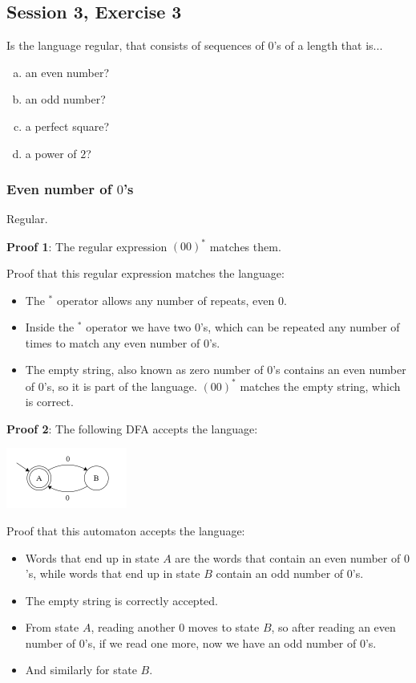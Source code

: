 \subsection{Session 3, Exercise 3}


Is the language regular, that consists of sequences of $0$'s of a length that is...
\begin{enumerate}[a.)]
\item an even number?
\item an odd number?
\item a perfect square?
\item a power of $2$?
\end{enumerate}


\subsubsection{Even number of $0$'s}

Regular.

\textbf{Proof 1}: The regular expression $(00)^*$ matches them.

Proof that this regular expression matches the language:

\begin{itemize}
    \item The $^*$ operator allows any number of repeats, even 0.
    \item Inside the $^*$ operator we have two $0$'s, which can be repeated any number of times to match any even number of $0$'s.
    \item The empty string, also known as zero number of $0$'s contains an even number of $0$'s, so it is part of the language. $(00)^*$ matches the empty string, which is correct.
\end{itemize}

\textbf{Proof 2}: The following DFA accepts the language:

\includegraphics[width=150px]{03/even_zeroes.png}

Proof that this automaton accepts the language:

\begin{itemize}
    \item Words that end up in state $A$ are the words that contain an even number of $0$'s, while words that end up in state $B$ contain an odd number of $0$'s.
    \item The empty string is correctly accepted.
    \item From state $A$, reading another $0$ moves to state $B$, so after reading an even number of $0$'s, if we read one more, now we have an odd number of $0$'s.
    \item And similarly for state $B$.
\end{itemize}

